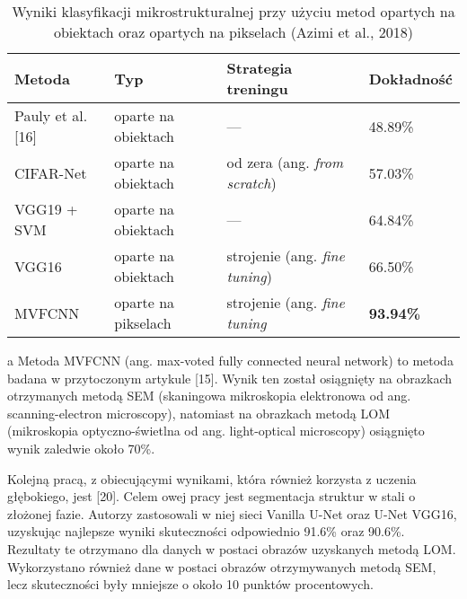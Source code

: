 \begin{table}[h]
	\centering
	
	\begin{threeparttable}
		\caption{Wyniki klasyfikacji mikrostrukturalnej przy użyciu metod opartych na obiektach oraz opartych na pikselach (Azimi et al., 2018)}
		\label{tab:tab1}
		
		\begin{tabularx}{1\textwidth}{ |X|X|X|X| }
  \hline
   \textbf{Metoda} & \textbf{Typ} & \textbf{Strategia treningu} & \textbf{Dokładność}\\
  \hline
  Pauly et al. [16] & oparte na obiektach & — & 48.89\%\\
  \hline
  CIFAR-Net & oparte na obiektach & od zera (ang. \textit{from scratch}) & 57.03\%\\
  \hline
  VGG19 + SVM & oparte na obiektach & — & 64.84\%\\
  \hline
  VGG16 & oparte na obiektach & strojenie (ang. \textit{fine tuning}) & 66.50\%\\
  \hline
  MVFCNN\tnote{a} & oparte na pikselach & strojenie (ang. \textit{fine tuning} & \textbf{93.94\%}\\
  \hline
\end{tabularx}
		
		\begin{tablenotes}
			\footnotesize
			\item[a] Metoda MVFCNN (ang. max-voted fully connected neural network) to metoda badana w przytoczonym artykule [15]. Wynik ten został osiągnięty na obrazkach otrzymanych metodą SEM (skaningowa mikroskopia elektronowa od ang. scanning-electron microscopy), natomiast na obrazkach metodą LOM (mikroskopia optyczno-świetlna od ang. light-optical microscopy) osiągnięto wynik zaledwie około 70\%.\textellipsis
		\end{tablenotes}
		
	\end{threeparttable}
\end{table}

Kolejną pracą, z obiecującymi wynikami, która również korzysta z uczenia głębokiego, jest [20]. Celem owej pracy jest segmentacja struktur w stali o złożonej fazie. Autorzy zastosowali w niej sieci Vanilla U-Net oraz U-Net VGG16, uzyskując najlepsze wyniki skuteczności odpowiednio 91.6\% oraz 90.6\%. Rezultaty te otrzymano dla danych w postaci obrazów uzyskanych metodą LOM. Wykorzystano również dane w postaci obrazów otrzymywanych metodą SEM, lecz skuteczności były mniejsze o około 10 punktów procentowych.

